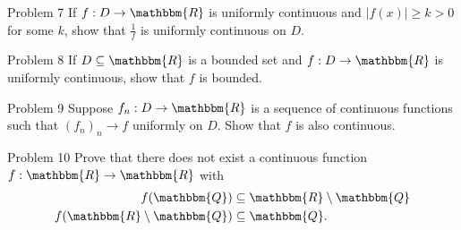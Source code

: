 \documentclass[8pt]{extarticle}
\newcommand{\Q}{\mathbbm{Q}}
\newcommand{\R}{\mathbbm{R}}
\begin{document}
  \begin{problem}{Problem 7}
    If $f: D\rightarrow \R$ is uniformly continuous and $|f(x)| \geq k > 0$ for some $k$, show that $\frac{1}{f}$ is uniformly continuous on $D$.
  \end{problem}
  \begin{problem}{Problem 8}
    If $D\subseteq \R$ is a bounded set and $f: D\rightarrow \R$ is uniformly continuous, show that $f$ is bounded.
  \end{problem}
  \begin{problem}{Problem 9}
    Suppose $f_n: D\rightarrow \R$ is a sequence of continuous functions such that $(f_n)_n \rightarrow f$ uniformly on $D$. Show that $f$ is also continuous.
  \end{problem}
  \begin{problem}{Problem 10}
    Prove that there does not exist a continuous function $f: \R\rightarrow \R$ with
    \begin{align*}
      f(\Q) &\subseteq \R\setminus\Q\\
      f(\R\setminus\Q) &\subseteq \Q.
    \end{align*}
  \end{problem}
\end{document}
